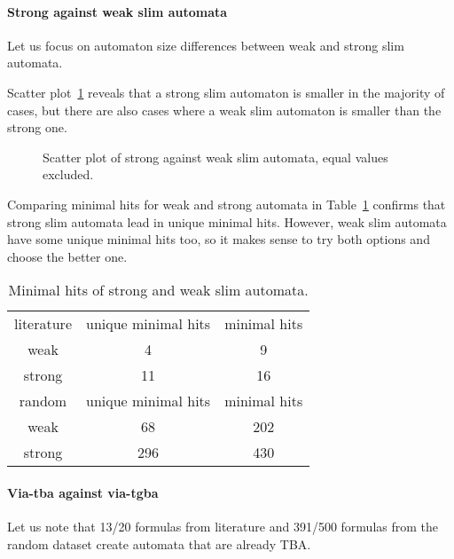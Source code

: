 \documentclass[
	digital,
nolof, nolot
]{fithesis3}
\begin{document}
	
	\paragraph{Strong against weak slim automata}
	Let us focus on automaton size differences between weak and strong slim automata.
	
	Scatter plot~\ref{scatter:weakstrong} reveals that a strong slim automaton is smaller in the majority of cases, but there are also cases where a weak slim automaton is smaller than the strong one.
		\begin{figure}[ht]
			
			\centering 
			\caption{Scatter plot of strong against weak slim automata, equal values excluded. }
			\label{scatter:weakstrong}
		\begin{tikzpicture}
			
		\end{tikzpicture}
	\end{figure}
	
		Comparing minimal hits for weak and strong automata in Table~\ref{table:weakstrongminhits} confirms that strong slim automata lead in unique minimal hits. However, weak slim automata have some unique minimal hits too, so it makes sense to try both options and choose the better one. 
		\begin{table}[ht]
			\centering
			
			\caption{Minimal hits of strong and weak slim automata.}
			\label{table:weakstrongminhits}
			\begin{tabular}{ |c||c|c| } 
				\hline
				literature&unique minimal hits&minimal hits\\
				\hhline{|===|}
				weak&4 & 9\\
				\hline
				strong&11 & 16\\ 
				\hline
				\hline
				random&unique minimal hits&minimal hits\\
				\hhline{|===|}
				weak&68 & 202\\
				\hline
				strong&296 & 430\\ 
				\hline
			\end{tabular}
		\end{table}

		\paragraph{Via-tba against via-tgba}
		Let us note that 13/20 formulas from literature and 391/500 formulas from the random dataset create automata that are already TBA.
		
\end{document}
